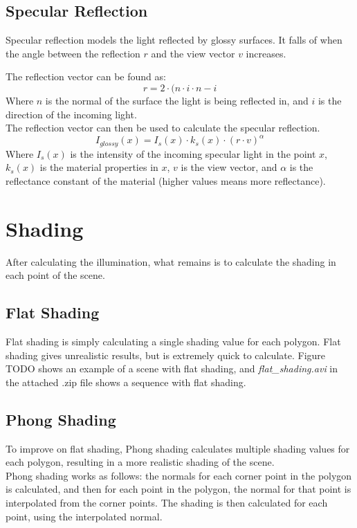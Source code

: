 \documentclass[a4paper,11pt]{article}
\begin{document}
\subsection{Specular Reflection}
Specular reflection models the light reflected by glossy surfaces. It falls of when the angle between the reflection $r$ and the view vector $v$ increases.

The reflection vector can be found as:
\[r=2 \cdot (n \cdot i \cdot n - i\]
Where $n$ is the normal of the surface the light is being reflected in, and $i$ is the direction of the incoming light.\\

The reflection vector can then be used to calculate the specular reflection.
\[I_{glossy}(x)=I_s(x) \cdot k_s(x) \cdot (r \cdot v)^\alpha\]
Where $I_s(x)$ is the intensity of the incoming specular light in the point $x$, $k_s(x)$ is the material properties in $x$, $v$ is the view vector, and $\alpha$ is the reflectance constant of the material (higher values means more reflectance).
\section{Shading}
After calculating the illumination, what remains is to calculate the shading in each point of the scene.
\subsection{Flat Shading}
Flat shading is simply calculating a single shading value for each polygon. Flat shading gives unrealistic results, but is extremely quick to calculate. Figure TODO shows an example of a scene with flat shading, and \emph{flat\_shading.avi} in the attached .zip file shows a sequence with flat shading. 

\subsection{Phong Shading}
To improve on flat shading, Phong shading calculates multiple shading values for each polygon, resulting in a more realistic shading of the scene.\\

Phong shading works as follows: the normals for each corner point in the polygon is calculated, and then for each point in the polygon, the normal for that point is interpolated from the corner points. The shading is then calculated for each point, using the interpolated normal.\\
\end{document}
